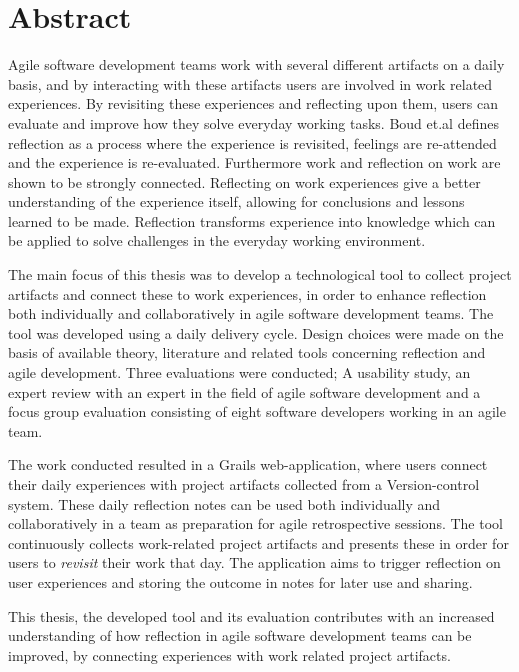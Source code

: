 \section*{Abstract}
Agile software development teams work with several different artifacts on a daily basis, and by interacting with these artifacts users are involved in work related experiences. By revisiting these experiences and reflecting upon them, users can evaluate and improve how they solve everyday working tasks. Boud et.al defines reflection as a process where the experience is revisited, feelings are re-attended and the experience is re-evaluated\citep{boudreflection1985}. 
Furthermore work and reflection on work are shown to be strongly connected\citep{Schon1983}\citep{Chaiklin1993}. Reflecting on work experiences give a better understanding of the experience itself, allowing for conclusions and lessons learned to be made. 
Reflection transforms experience into knowledge which can be applied to solve challenges in the everyday working environment. 

The main focus of this thesis was to develop a technological tool to collect project artifacts and connect these to work experiences, in order to enhance reflection both individually and collaboratively in agile software development teams.
The tool was developed using a daily delivery cycle. Design choices were made on the basis of available theory, literature and related tools concerning reflection and agile development. Three evaluations were conducted; A usability study, an expert review with an expert in the field of agile software development and a focus group evaluation consisting of eight software developers working in an agile team. 

The work conducted resulted in a Grails web-application, where users connect their daily experiences with project artifacts collected from a Version-control system. These daily reflection notes can be used both individually and collaboratively in a team as preparation for agile retrospective sessions. The tool continuously collects work-related project artifacts and presents these in order for users to \emph{revisit} their work that day. The application aims to trigger reflection on user experiences and storing the outcome in notes for later use and sharing.

This thesis, the developed tool and its evaluation contributes with an increased understanding of how reflection in agile software development teams can be improved, by connecting experiences with work related project artifacts. 

\newpage